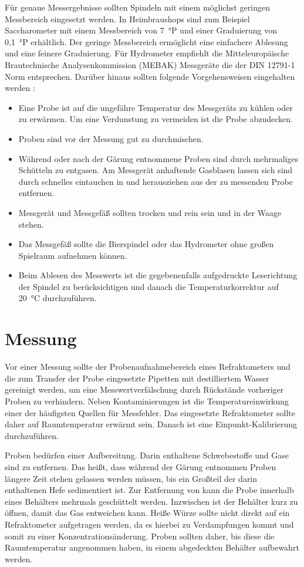 \documentclass[a4paper,parskip=half]{scrartcl}
\begin{document}
Für genaue Messergebnisse sollten Spindeln mit einem möglichst
geringen Messbereich eingesetzt werden. In Heimbraushops sind
zum Beispiel Saccharometer mit einem Messbereich von 7~°P
und einer Graduierung von 0,1~°P erhältlich. Der geringe Messbereich
ermöglicht eine einfachere Ablesung und eine feinere Graduierung.
Für Hydrometer empfiehlt die Mitteleuropäische Brautechnische
Analysenkommission (MEBAK) Messgeräte die der DIN 12791-1 Norm
entsprechen. Darüber hinaus sollten folgende Vorgehensweisen
eingehalten werden \autocite{Kunze2004,MEBAK2013,Narziss2009,Wolf2015}:

\begin{itemize}
\item Eine Probe ist auf die ungefähre Temperatur des
Messgeräts zu kühlen oder zu erwärmen. Um eine Verdunstung
zu vermeiden ist die Probe abzudecken.
\item Proben sind vor der Messung gut zu durchmischen.
\item Während oder nach der Gärung entnommene Proben sind
durch mehrmaliges Schütteln zu entgasen. Am Messgerät
anhaftende Gasblasen lassen sich sind durch schnelles eintauchen
in und herausziehen aus der zu messenden Probe entfernen.
\item Messgerät und Messgefäß sollten trocken und rein sein
und in der Waage stehen.
\item Das Messgefäß sollte die Bierspindel oder das Hydrometer
ohne großen Spielraum aufnehmen können.
\item Beim Ablesen des Messwerts ist die gegebenenfalls aufgedruckte
Leserichtung der Spindel zu berücksichtigen und danach die
Temperaturkorrektur auf 20~°C durchzuführen.
\end{itemize}

\section*{Messung}

Vor einer Messung sollte der Probenaufnahmebereich eines Refraktometers
und die zum Transfer der Probe eingesetzte Pipetten mit destilliertem Wasser
gereinigt werden, um eine Messwertverfälschung durch Rückstände vorheriger
Proben zu verhindern. Neben Kontaminierungen ist die Temperatureinwirkung
einer der häufigsten Quellen für Messfehler. Das eingesetzte Refraktometer
sollte daher auf Raumtemperatur erwärmt sein. Danach ist eine 
Einpunkt-Kalibrierung durchzuführen. \autocite{Depalma2017}

Proben bedürfen einer Aufbereitung. Darin enthaltene Schwebestoffe und
Gase sind zu entfernen. Das heißt, dass
während der Gärung entnommen Proben längere Zeit stehen gelassen werden
müssen, bis ein Großteil der darin enthaltenen Hefe sedimentiert
ist. Zur Entfernung von  kann die Probe innerhalb eines
Behälters mehrmals geschüttelt werden. Inzwischen ist der Behälter
kurz zu öffnen, damit das Gas entweichen kann. Heiße Würze
sollte nicht direkt auf ein Refraktometer aufgetragen werden,
da es hierbei zu Verdampfungen kommt und somit zu einer
Konzentrationsänderung. Proben sollten daher,
bis diese die Raumtemperatur angenommen haben, in einem abgedeckten
Behälter aufbewahrt werden. \autocite{Gamer1959,MEBAK2013,Terrill2013}
\end{document}
